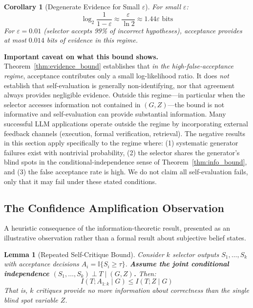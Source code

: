 \documentclass[11pt]{article}
\newtheorem{lemma}[theorem]{Lemma}
\newtheorem{corollary}[theorem]{Corollary}
\begin{document}
\begin{corollary}[Degenerate Evidence for Small $\varepsilon$]
For small $\varepsilon$:
\begin{equation}
\log_2 \frac{1}{1 - \varepsilon} \approx \frac{\varepsilon}{\ln 2} \approx 1.44\varepsilon \text{ bits}
\end{equation}
For $\varepsilon = 0.01$ (selector accepts 99\% of incorrect hypotheses), acceptance provides at most $0.014$ bits of evidence in this regime.
\end{corollary}

\textbf{Important caveat on what this bound shows.} Theorem~\ref{thm:evidence_bound} establishes that \emph{in the high-false-acceptance regime}, acceptance contributes only a small log-likelihood ratio. It does \emph{not} establish that self-evaluation is generally non-identifying, nor that agreement always provides negligible evidence. Outside this regime---in particular when the selector accesses information not contained in $(G, Z)$---the bound is not informative and self-evaluation can provide substantial information. Many successful LLM applications operate outside the regime by incorporating external feedback channels (execution, formal verification, retrieval). The negative results in this section apply specifically to the regime where: (1) systematic generator failures exist with nontrivial probability, (2) the selector shares the generator's blind spots in the conditional-independence sense of Theorem~\ref{thm:info_bound}, and (3) the false acceptance rate is high. We do not claim all self-evaluation fails, only that it may fail under these stated conditions.

\subsection{The Confidence Amplification Observation}

A heuristic consequence of the information-theoretic result, presented as an illustrative observation rather than a formal result about subjective belief states.

\begin{lemma}[Repeated Self-Critique Bound]
\label{lem:repeated}
Consider $k$ selector outputs $S_1, \ldots, S_k$ with acceptance decisions $A_i = \mathbb{I}\{S_i \geq \tau\}$. \textbf{Assume the joint conditional independence $(S_1, \ldots, S_k) \perp T \mid (G, Z)$.} Then:
\begin{equation}
I(T; A_{1:k} \mid G) \leq I(T; Z \mid G)
\end{equation}
That is, $k$ critiques provide no more information about correctness than the single blind spot variable $Z$.
\end{lemma}
\end{document}
